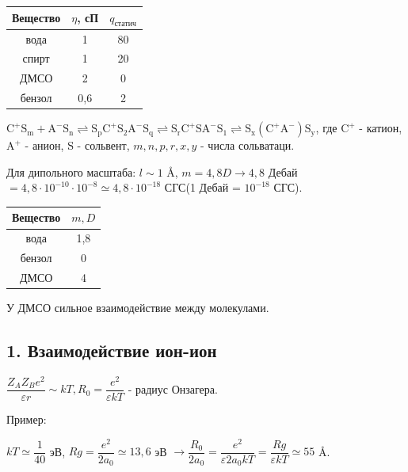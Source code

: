\begin{lecture}
\begin{lecSection}
\begin{center}
\begin{tabular}{|c|c|c|}
	\hline 
	Вещество & $\eta$, сП & $q_{статич}$ \\ 
	\hline 
	вода & 1 & 80 \\ 
	\hline 
	спирт & 1 & 20 \\ 
	\hline 
	ДМСО & 2 & 0 \\ 
	\hline 
	бензол & 0,6 & 2 \\ 
	\hline 
\end{tabular}
 \end{center}

	\end{lecSection}

	\begin{lecSection}
		
		$\mathrm{C^+S_m + A^-S_n \rightleftharpoons S_pC^+S_2A^-S_q \rightleftharpoons S_rC^+SA^-S_1 \rightleftharpoons S_x(C^+A^-)S_y}$, где $\mathrm{C^+}$ - катион, $\mathrm{A^+}$ - анион, $\mathrm{S}$ - сольвент, $m, n, p, r, x, y$ - числа сольватаци.
		\par Для дипольного масштаба: $l \sim 1$ \AA, $m = 4,8 D \rightarrow 4,8$ Дебай $= 4,8 \cdot 10^{-10} \cdot 10^{-8} \simeq 4,8 \cdot 10^{-18}$ СГС(1 Дебай = $10^{-18}$ СГС).
		\begin{center}
			\begin{tabular}{|c|c|}
				\hline 
				Вещество & $m, D$ \\ 
				\hline 
				вода & 1,8 \\ 
				\hline 
				бензол & 0 \\ 
				\hline 
				ДМСО & 4 \\ 
				\hline 
			\end{tabular} 
		\end{center}
	У ДМСО сильное взаимодействие между молекулами.
		
	\end{lecSection}

	\begin{lecSection}
		
		\subsection{1. Взаимодействие ион-ион}
		
		$\dfrac{Z_AZ_Be^2}{\varepsilon r} \sim kT, R_0 = \dfrac{e^2}{\varepsilon kT}$ - радиус Онзагера.
		\par Пример:
		\par $kT \simeq \dfrac{1}{40}$ эВ, $Rg = \dfrac{e^2}{2 a_0} \simeq 13,6$ эВ $ \rightarrow \dfrac{R_0}{2a_0} = \dfrac{e^2}{\varepsilon 2a_0 kT} = \dfrac{Rg}{\varepsilon kT} \simeq 55$ \AA.


\end{lecSection}
\end{lecture}
